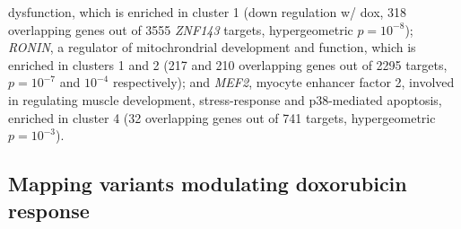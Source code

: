 \documentclass{article}
\begin{document}
dysfunction\cite{Lu2012}, which is enriched in cluster 1 (down regulation w/ dox, 318 overlapping genes out of 3555 \emph{ZNF143} targets, hypergeometric $p=10^{-8}$); \emph{RONIN}, a regulator of mitochrondrial development and function\cite{Poche2016}, which is enriched in clusters 1 and 2 (217 and 210 overlapping genes out of 2295 targets, $p=10^{-7}$ and $10^{-4}$ respectively); and \emph{MEF2}, myocyte enhancer factor 2, involved in regulating muscle development, stress-response and p38-mediated apoptosis\cite{Zarubin2005}, enriched in cluster 4 (32 overlapping genes out of 741 targets, hypergeometric $p=10^{-3}$). 

\subsection*{Mapping variants modulating doxorubicin response}
\end{document}
